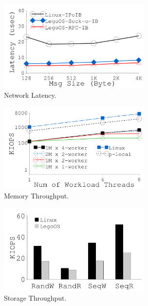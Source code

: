 {
\begin{figure}[th]
\begin{minipage}{3in}
\begin{center}
\centerline{\includegraphics[width=3in]{lego/Figures/g_plot_LEGO_latency.pdf}}
\caption[Network Latency.]{Network Latency.}
\label{fig-net-latency}
\end{center}
\end{minipage}
\end{figure}
}
{
\begin{figure}[th]
\begin{minipage}{3in}
\begin{center}
\centerline{\includegraphics[width=3in]{lego/Figures/g_plot_LEGO_iops_memory.pdf}}
\caption[Memory Throughput]{Memory Throughput.}
\label{fig-iops-memory}
\end{center}
\end{minipage}
\end{figure}
}
{
\begin{figure}[th]
\begin{minipage}{3in}
\begin{center}
\centerline{\includegraphics[width=3in]{lego/Figures/g_plot_LEGO_iops_storage.pdf}}
\caption[Storage Throughput.]{Storage Throughput.} 
\label{fig-iops-storage}
\end{center}
\end{minipage}
\end{figure}
}
